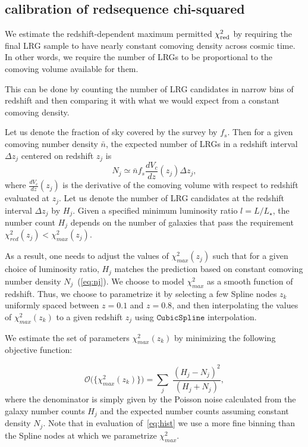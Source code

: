 \documentclass[fleqn,usenatbib]{mnras}
\newcommand{\be}{\begin{equation}}
\newcommand{\ee}{\end{equation}}
\begin{document}
\subsection{calibration of redsequence chi-squared}\label{sec:chimax}

We estimate the redshift-dependent maximum permitted $\chi^{2}_{\rm red}$ by requiring the final LRG sample to have nearly constant comoving density across cosmic time. In other words, we require the number of LRGs to be proportional to the comoving volume available for them.

This can be done by counting the number of LRG candidates in narrow bins of redshift and then comparing it with what we would expect from a constant comoving density. 

Let us denote the fraction of sky covered by the survey by $f_{s}$. Then for a given comoving number density $\bar{n}$, the expected number of LRGs in a redshift interval $\Delta z_j$ centered on redshift $z_j$ is 
\be 
N_j \simeq \bar{n}f_s\frac{dV_c}{dz}(z_j)\Delta z_j,
\label{eq:nj}
\ee
where $\frac{dV_c}{dz}(z_j)$ is the derivative of the comoving volume with respect to redshift evaluated at $z_j$. Let us denote the number of LRG candidates at the redshift interval $\Delta z_j$ by $H_j$. Given a specified minimum luminosity ratio $l=L/L_{\star}$, the number count $H_j$ depends on the number of galaxies that pass the requirement $\chi^{2}_{red}(z_j) < \chi^{2}_{max}(z_j)$. 

As a result, one needs to adjust the values of $\chi^{2}_{max}(z_j)$ such that for a given choice of luminosity ratio, $H_j$ matches the prediction based on constant comoving number density $N_j$~(\ref{eq:nj}). We choose to model $\chi^{2}_{max}$ as a smooth function of redshift. Thus, we choose to parametrize it by selecting a few Spline nodes $z_{k}$ uniformly spaced between $z=0.1$ and $z=0.8$, and then interpolating the values of $\chi^{2}_{max}(z_k)$ to a given redshift $z_j$ using $\mathtt{CubicSpline}$ interpolation.

We estimate the set of parameters $\chi^{2}_{max}(z_k)$ by minimizing the following objective function:

\be 
\mathcal{O}\big(\{\chi^{2}_{max}(z_k)\}\big) = \sum_j \; \frac{(H_j-N_j)^{2}}{(H_j + N_j)},
\label{eq:hist}
\ee
where the denominator is simply given by the Poisson noise calculated from the galaxy number counts $H_j$ and the expected number counts assuming constant density $N_j$. Note that in evaluation of~\ref{eq:hist} we use a more fine binning than the Spline nodes at which we parametrize $\chi^{2}_{max}$. 
\end{document}
